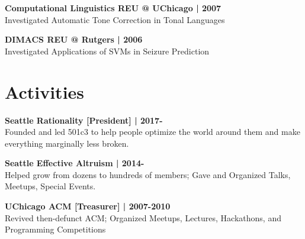 \documentclass[]{resume}
\begin{document}
\begin{minipage}[t]{0.33\textwidth}
\textbf{Computational Linguistics REU @ UChicago | 2007}\\
Investigated Automatic Tone Correction in Tonal Languages\\
\sectionsep

\textbf{DIMACS REU @ Rutgers | 2006}\\
Investigated Applications of SVMs in Seizure Prediction







\section{Activities}
\textbf{Seattle Rationality [President] | 2017-}\\
Founded and led 501c3 to help people optimize the world
around them and make everything marginally less broken.
\sectionsep

\textbf{Seattle Effective Altruism | 2014-}\\
Helped grow from dozens to hundreds of members;
Gave and Organized Talks, Meetups, Special Events.\\
\sectionsep

\textbf{UChicago ACM [Treasurer] | 2007-2010} \\
Revived then-defunct ACM; Organized Meetups, Lectures,
Hackathons, and Programming Competitions \\
\sectionsep


\end{minipage}
\end{document}
